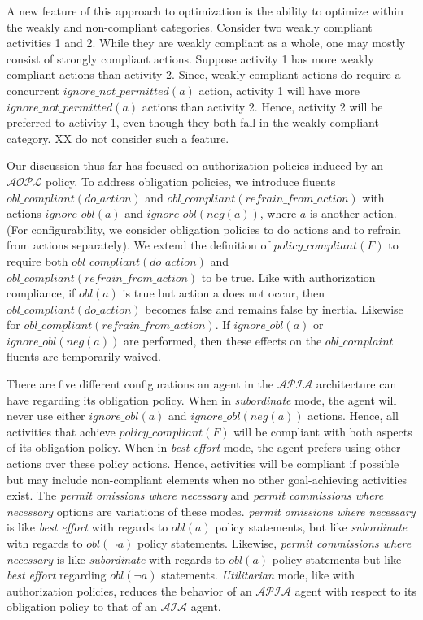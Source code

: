 A new feature of this approach to optimization is the ability to optimize within the weakly and non-compliant categories.
Consider two weakly compliant activities 1 and 2.
While they are weakly compliant as a whole, one may mostly consist of strongly compliant actions.
Suppose activity 1 has more weakly compliant actions than activity 2.
Since, weakly compliant actions do require a concurrent $ignore\_not\_permitted(a)$ action, activity 1 will have more $ignore\_not\_permitted(a)$ actions than activity 2.
Hence, activity 2 will be preferred to activity 1, even though they both fall in the weakly compliant category.
XX do not consider such a feature.

Our discussion thus far has focused on authorization policies induced by an $\mathcal{AOPL}$ policy.
To address obligation policies, we introduce fluents $obl\_compliant(do\_action)$ and $obl\_compliant(refrain\_from\_action)$ with actions $ignore\_obl(a)$ and $ignore\_obl(neg(a))$, where $a$ is another action.
(For configurability, we consider obligation policies to do actions and to refrain from actions separately).
We extend the definition of $policy\_compliant(F)$ to require both $obl\_compliant(do\_action)$ and $obl\_compliant(refrain\_from\_action)$ to be true.
Like with authorization compliance, if $obl(a)$ is true but action a does not occur, then $obl\_compliant(do\_action)$ becomes false and remains false by inertia.
Likewise for $obl\_compliant(refrain\_from\_action)$.
If $ignore\_obl(a)$ or $ignore\_obl(neg(a))$ are performed, then these effects on the $obl\_complaint$ fluents are temporarily waived.

There are five different configurations an agent in the $\mathcal{APIA}$ architecture can have regarding its obligation policy.
When in \textit{subordinate} mode, the agent will never use either $ignore\_obl(a)$ and $ignore\_obl(neg(a))$ actions.
Hence, all activities that achieve $policy\_compliant(F)$ will be compliant with both aspects of its obligation policy.
When in \textit{best effort} mode, the agent prefers using other actions over these policy actions.
Hence, activities will be compliant if possible but may include non-compliant elements when no other goal-achieving activities exist.
The \textit{permit omissions where necessary} and \textit{permit commissions where necessary} options are variations of these modes.
\textit{permit omissions where necessary} is like \textit{best effort} with regards to $obl(a)$ policy statements, but like \textit{subordinate} with regards to $obl(\neg a)$ policy statements.
Likewise, \textit{permit commissions where necessary} is like \textit{subordinate} with regards to $obl(a)$ policy statements but like \textit{best effort} regarding $obl(\neg a)$ statements.
\textit{Utilitarian} mode, like with authorization policies, reduces the behavior of an $\mathcal{APIA}$ agent with respect to its obligation policy to that of an $\mathcal{AIA}$ agent.

